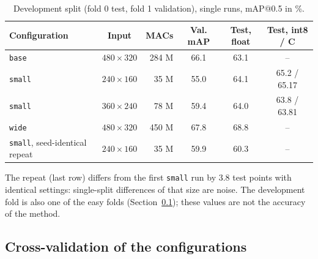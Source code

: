\documentclass[11pt,a4paper]{article}
\newcommand{\cfg}[1]{\texttt{#1}}
\begin{document}
\begin{table}[H]
  \centering
  \small
  \caption{Development split (fold 0 test, fold 1 validation), single runs,
  mAP@0.5 in \%.}
  \label{tab:dev}
  \begin{tabular}{lcrccc}
    \toprule
    Configuration & Input & MACs & Val. mAP & Test, float & Test, int8 / C \\
    \midrule
    \cfg{base} & $480{\times}320$ & 284 M & 66.1 & 63.1 & -- \\
    \cfg{small} & $240{\times}160$ & 35 M & 55.0 & 64.1 & 65.2 / 65.17 \\
    \cfg{small} & $360{\times}240$ & 78 M & 59.4 & 64.0 & 63.8 / 63.81 \\
    \cfg{wide} & $480{\times}320$ & 450 M & 67.8 & 68.8 & -- \\
    \cfg{small}, seed-identical repeat & $240{\times}160$ & 35 M & 59.9 & 60.3 & -- \\
    \bottomrule
  \end{tabular}
\end{table}

The repeat (last row) differs from the first \cfg{small} run by 3.8 test
points with identical settings: single-split differences of that size are
noise. The development fold is also one of the easy folds
(Section~\ref{sec:cv}); these values are not the accuracy of the method.

\subsection{Cross-validation of the configurations}
\label{sec:cv}
\end{document}
